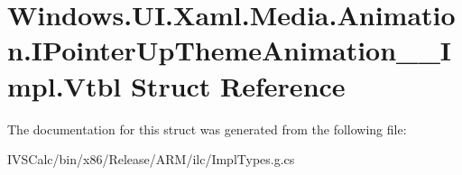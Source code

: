 \hypertarget{struct_windows_1_1_u_i_1_1_xaml_1_1_media_1_1_animation_1_1_i_pointer_up_theme_animation_____impl_1_1_vtbl}{}\section{Windows.\+U\+I.\+Xaml.\+Media.\+Animation.\+I\+Pointer\+Up\+Theme\+Animation\+\_\+\+\_\+\+Impl.\+Vtbl Struct Reference}
\label{struct_windows_1_1_u_i_1_1_xaml_1_1_media_1_1_animation_1_1_i_pointer_up_theme_animation_____impl_1_1_vtbl}


The documentation for this struct was generated from the following file\+:\begin{DoxyCompactItemize}
\item 
I\+V\+S\+Calc/bin/x86/\+Release/\+A\+R\+M/ilc/Impl\+Types.\+g.\+cs\end{DoxyCompactItemize}
